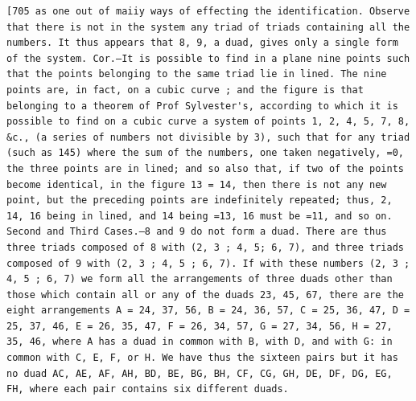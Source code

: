 \documentclass[11pt,a4paper]{book}
\begin{document}
\newpage
\setcounter{page}{572}
\begin{verbatim}
[705 as one out of maiiy ways of effecting the identification. Observe that there is not in the system any triad of triads containing all the numbers. It thus appears that 8, 9, a duad, gives only a single form of the system. Cor.—It is possible to find in a plane nine points such that the points belonging to the same triad lie in lined. The nine points are, in fact, on a cubic curve ; and the figure is that belonging to a theorem of Prof Sylvester's, according to which it is possible to find on a cubic curve a system of points 1, 2, 4, 5, 7, 8, &c., (a series of numbers not divisible by 3), such that for any triad (such as 145) where the sum of the numbers, one taken negatively, =0, the three points are in lined; and so also that, if two of the points become identical, in the figure 13 = 14, then there is not any new point, but the preceding points are indefinitely repeated; thus, 2, 14, 16 being in lined, and 14 being =13, 16 must be =11, and so on. Second and Third Cases.—8 and 9 do not form a duad. There are thus three triads composed of 8 with (2, 3 ; 4, 5; 6, 7), and three triads composed of 9 with (2, 3 ; 4, 5 ; 6, 7). If with these numbers (2, 3 ; 4, 5 ; 6, 7) we form all the arrangements of three duads other than those which contain all or any of the duads 23, 45, 67, there are the eight arrangements A = 24, 37, 56, B = 24, 36, 57, C = 25, 36, 47, D = 25, 37, 46, E = 26, 35, 47, F = 26, 34, 57, G = 27, 34, 56, H = 27, 35, 46, where A has a duad in common with B, with D, and with G: in common with C, E, F, or H. We have thus the sixteen pairs but it has no duad AC, AE, AF, AH, BD, BE, BG, BH, CF, CG, GH, DE, DF, DG, EG, FH, where each pair contains six different duads. 
\end{verbatim}
\end{document}
